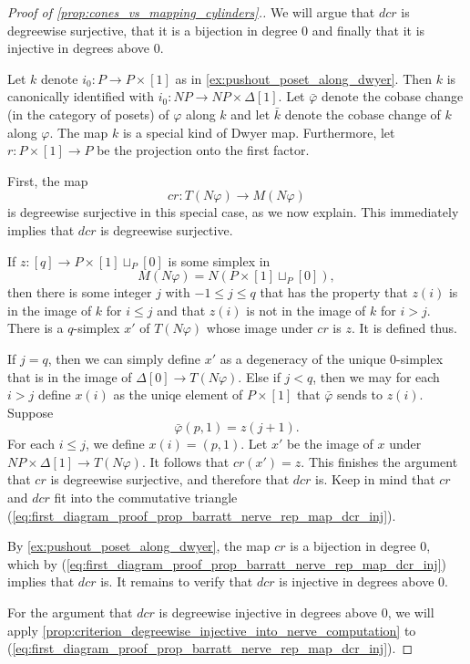 \begin{proof}[Proof of \cref{prop:cones_vs_mapping_cylinders}.]
We will argue that $dcr$ is degreewise surjective, that it is a bijection in degree $0$ and finally that it is injective in degrees above $0$.

Let $k$ denote $i_0:P\to P\times[1]$ as in \cref{ex:pushout_poset_along_dwyer}. Then $k$ is canonically identified with $i_0:NP\to NP\times \Delta [1]$. Let $\bar{\varphi }$ denote the cobase change (in the category of posets) of $\varphi$ along $k$ and let $\bar{k}$ denote the cobase change of $k$ along $\varphi$. The map $k$ is a special kind of Dwyer map. Furthermore, let $r:P\times [1]\to P$ be the projection onto the first factor.

First, the map
\[cr:T(N\varphi )\to M(N\varphi )\]
is degreewise surjective in this special case, as we now explain. This immediately implies that $dcr$ is degreewise surjective.

If $z:[q]\to P\times [1]\sqcup _{P}[0]$ is some simplex in
\[M(N\varphi )=N(P\times [1]\sqcup _{P}[0]),\]
then there is some integer $j$ with $-1\leq j\leq q$ that has the property that $z(i)$ is in the image of $k$ for $i\leq j$ and that $z(i)$ is not in the image of $k$ for $i>j$. There is a $q$-simplex $x'$ of $T(N\varphi )$ whose image under $cr$ is $z$. It is defined thus.

If $j=q$, then we can simply define $x'$ as a degeneracy of the unique $0$-simplex that is in the image of $\Delta [0]\to T(N\varphi )$. Else if $j<q$, then we may for each $i>j$ define $x(i)$ as the uniqe element of $P\times [1]$ that $\bar{\varphi }$ sends to $z(i)$. Suppose
\[\bar{\varphi } (p,1)=z(j+1).\]
For each $i\leq j$, we define $x(i)=(p,1)$. Let $x'$ be the image of $x$ under $NP\times \Delta [1]\to T(N\varphi )$. It follows that $cr(x')=z$. This finishes the argument that $cr$ is degreewise surjective, and therefore that $dcr$ is. Keep in mind that $cr$ and $dcr$ fit into the commutative triangle (\ref{eq:first_diagram_proof_prop_barratt_nerve_rep_map_dcr_inj}).

By \cref{ex:pushout_poset_along_dwyer}, the map $cr$ is a bijection in degree $0$, which by (\ref{eq:first_diagram_proof_prop_barratt_nerve_rep_map_dcr_inj}) implies that $dcr$ is. It remains to verify that $dcr$ is injective in degrees above $0$.

For the argument that $dcr$ is degreewise injective in degrees above $0$, we will apply \cref{prop:criterion_degreewise_injective_into_nerve_computation} to (\ref{eq:first_diagram_proof_prop_barratt_nerve_rep_map_dcr_inj}).


\end{proof}
